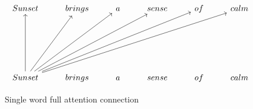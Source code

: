\begin{figure}[h]
\[\begin{tikzcd}[row sep=2.25em]
	Sunset & brings & a & sense & of & calm \\
	\\
	\\
	Sunset & brings & a & sense & of & calm
	\arrow[from=4-1, to=1-1]
	\arrow[from=4-1, to=1-2]
	\arrow[from=4-1, to=1-3]
	\arrow[from=4-1, to=1-4]
	\arrow[from=4-1, to=1-5]
	\arrow[from=4-1, to=1-6]
\end{tikzcd}\]
\caption{Single word full attention connection}
\label{chart:single_word_attention}
\end{figure}